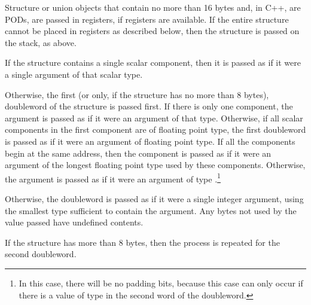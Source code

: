 Structure or union objects that contain no more than 16 bytes and, in
C++, are PODs, are passed in registers, if registers are available.
If the entire structure cannot be placed in registers as described
below, then the structure is passed on the stack, as above.

If the structure contains a single scalar component, then it is passed
as if it were a single argument of that scalar type.

Otherwise, the first (or only, if the structure has no more than 8
bytes), doubleword of the structure is passed first.  If there is only
one component, the argument is passed as if it were an argument of
that type.  Otherwise, if all scalar components in the first component
are of floating point type, the first doubleword is passed as if it
were an argument of floating point type.  If all the components begin
at the same address, then the component is passed as if it were an
argument of the longest floating point type used by these components.
Otherwise, the argument is passed as if it were an argument of type
.\footnote{In this case, there will be no padding
  bits, because this case can only occur if there is a value of type
   in the second word of the doubleword.}

Otherwise, the doubleword is passed as if it were a single integer
argument, using the smallest type sufficient to contain the argument.
Any bytes not used by the value passed have undefined contents.  

If the structure has more than 8 bytes, then the process is repeated
for the second doubleword.

